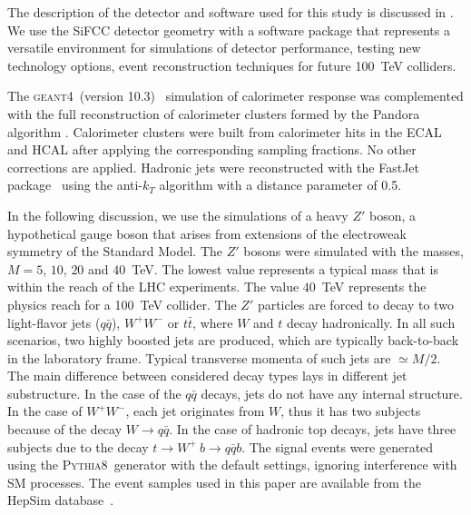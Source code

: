 \documentclass[final,1p,11pt]{elsarticle}
\newcommand{\GEANTfour} {\textsc{geant4}}
\newcommand{\pythia} {\textsc{Pythia8~}}
\begin{document}
The description of the detector and software used for this study is discussed in \cite{Chekanov:2016ppq}. 
We use the SiFCC detector geometry with a software package that
represents a versatile environment for simulations
of detector performance, testing new technology options, event reconstruction techniques for future
100~TeV colliders.

The \GEANTfour\ (version 10.3)~\cite{Allison2016186} simulation of calorimeter response was complemented 
with the full reconstruction of calorimeter clusters formed by the Pandora algorithm \cite{Charles:2009ta,Marshall:2013bda}.
Calorimeter clusters were built from calorimeter hits in the  ECAL and HCAL after applying the corresponding sampling fractions.
No other corrections are applied.
Hadronic jets were 
reconstructed with the {\sc FastJet} package~\cite{fastjet} using the anti-$k_T$ algorithm \cite{Cacciari:2008gp}
with  a distance parameter of 0.5. 

In the following discussion, we use the simulations of a heavy $Z'$ boson, 
a hypothetical gauge boson  that arises from extensions of the electroweak symmetry of the Standard Model.
The $Z'$ bosons were simulated with the masses, $M=5$, $10$, $20$ and $40$~TeV. The lowest value 
represents a typical mass that is within the reach of the LHC experiments. The  value $40$~TeV 
represents the physics reach for a  100~TeV collider. The $Z'$ particles are forced to decay 
to two light-flavor jets ($q\bar{q}$), $W^+W^-$ or $t\bar{t}$, where
$W$ and $t$ decay hadronically. In all such scenarios, two highly boosted
jets are produced,  which are typically back-to-back in the laboratory frame.
Typical transverse momenta of such jets are $\simeq M/2$.
The main difference between considered decay types lays in different jet substructure. In the case of the $q\bar{q}$ decays,
jets do not have any internal structure. In the case of  $W^+W^-$, each jet  originates from $W$, thus it has two
subjects because of the decay $W\rightarrow q\bar{q}$. In the case of hadronic top decays, jets have three subjects due
to the decay $t \rightarrow  W^+\>b \rightarrow q\bar{q} b$.    
The signal events were generated using the \pythia generator with the default settings,
ignoring interference with SM processes.
The event samples used in this paper are  available from the
HepSim  database~\cite{Chekanov:2014fga}.






\end{document}
